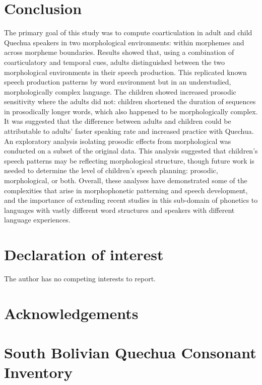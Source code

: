 \documentclass[a4paper,man,floatsintext,natbib,donotrepeattitle, apacite]{apa6}
\begin{document}
\section{Conclusion}

The primary goal of this study was to compute coarticulation in adult and child Quechua speakers in two morphological environments: within morphemes and across morpheme boundaries. Results showed that, using a combination of coarticulatory and temporal cues, adults distinguished between the two morphological environments in their speech production. This replicated known speech production patterns by word environment but in an understudied, morphologically complex language. The children showed increased prosodic sensitivity where the adults did not: children shortened the duration of sequences in prosodically longer words, which also happened to be morphologically complex. It was suggested that the difference between adults and children could be attributable to adults' faster speaking rate and increased practice with Quechua. An exploratory analysis isolating prosodic effects from morphological was conducted on a subset of the original data. This analysis suggested that children's speech patterns may be reflecting morphological structure, though future work is needed to determine the level of children's speech planning: prosodic, morphological, or both. Overall, these analyses have demonstrated some of the complexities that arise in morphophonetic patterning and speech development, and the importance of extending recent studies in this sub-domain of phonetics to languages with vastly different word structures and speakers with different language experiences. 

\section*{Declaration of interest}
The author has no competing interests to report. 

\section*{Acknowledgements}


\theendnotes



\appendix
\section{South Bolivian Quechua Consonant Inventory}\label{app:app-A}
\end{document}
